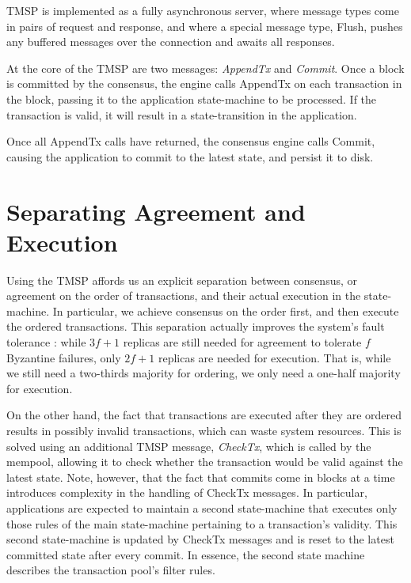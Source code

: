 TMSP is implemented as a fully asynchronous server, 
where message types come in pairs of request and response,
and where a special message type, Flush, pushes any buffered messages over the connection and awaits all responses.

At the core of the TMSP are two messages: \emph{AppendTx} and \emph{Commit}.
Once a block is committed by the consensus, 
the engine calls AppendTx on each transaction in the block, 
passing it to the application state-machine to be processed.
If the transaction is valid, it will result in a state-transition in the application.

Once all AppendTx calls have returned, the consensus engine calls Commit,
causing the application to commit to the latest state, and persist it to disk.

\section{Separating Agreement and Execution}

Using the TMSP affords us an explicit separation between consensus, or agreement on the order of transactions, 
and their actual execution in the state-machine.
In particular, we achieve consensus on the order first, and then execute the ordered transactions.
This separation actually improves the system's fault tolerance \cite{yin2003separating}:
while $3f+1$ replicas are still needed for agreement to tolerate $f$ Byzantine failures, 
only $2f+1$ replicas are needed for execution.
That is, while we still need a two-thirds majority for ordering, we only need a one-half majority for execution.

On the other hand, the fact that transactions are executed after they are ordered results in possibly invalid transactions,
which can waste system resources. 
This is solved using an additional TMSP message, \emph{CheckTx}, which is called by the mempool,
allowing it to check whether the transaction would be valid against the latest state.
Note, however, that the fact that commits come in blocks at a time introduces complexity in the handling of CheckTx messages.
In particular, applications are expected to maintain a second state-machine that executes only those rules of the main state-machine pertaining to a transaction's validity. 
This second state-machine is updated by CheckTx messages and is reset to the latest committed state after every commit.
In essence, the second state machine describes the transaction pool's filter rules.

